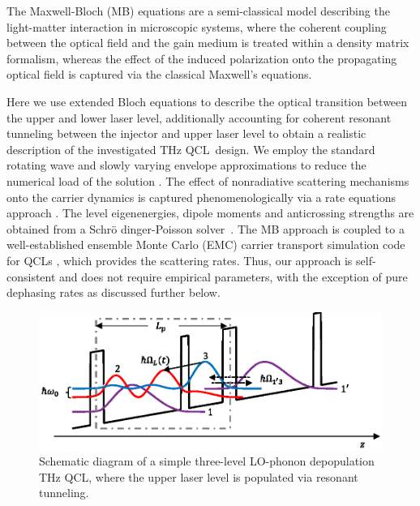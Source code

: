 \documentclass[10pt,letterpaper]{article}%
\begin{document}
\label{sec:thmodel}

The Maxwell-Bloch (MB) equations are a semi-classical model describing the
light-matter interaction in microscopic systems, where the coherent coupling
between the optical field and the gain medium is treated within a density
matrix formalism, whereas the effect of the induced polarization onto the
propagating optical field is captured via the classical Maxwell's equations.

Here we use extended Bloch equations to describe the optical transition
between the upper and lower laser level, additionally accounting for coherent
resonant tunneling between the injector and upper laser level to obtain a
realistic description of the investigated THz QCL\ design. We employ the
standard rotating wave and slowly varying envelope approximations to reduce
the numerical load of the solution
\cite{boyd2003nonlinear,wang2007coherent,gordon2008multimode,gkortsas2010dynamics}%
. The effect of nonradiative scattering mechanisms onto the carrier dynamics
is captured phenomenologically via a rate equations approach
\cite{wang2015active,jirauschek2014modeling}. The level eigenenergies, dipole
moments and anticrossing strengths are obtained from a Schr{\"{o}}%
dinger-Poisson solver\ \cite{2009IJQE...45..1059J}. The MB approach is coupled
to a well-established ensemble Monte Carlo (EMC) carrier transport simulation
code for QCLs
\cite{jirauschek2007comparative,jirauschek2009monte,jirauschek2010monte},
which provides the scattering rates. Thus, our approach is self-consistent and
does not require empirical parameters, with the exception of pure dephasing
rates as discussed further below. 
\begin{figure}[h]
\centering\includegraphics[scale=0.7]{figs/TOYMODEL.eps}\caption{Schematic
diagram of a simple three-level LO-phonon depopulation THz QCL, where the
upper laser level is populated via resonant tunneling.}%
\label{fig:img01}%
\end{figure}
\end{document}
